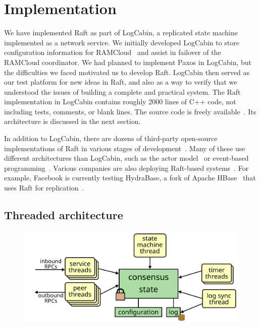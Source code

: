 \section{Implementation}

We have implemented Raft as part of LogCabin, a replicated state machine
implemented
as a network service. We initially developed LogCabin to store
configuration information for RAMCloud~\cite{Ousterhout:2011} and assist
in failover of the RAMCloud coordinator. We had planned to implement
Paxos in LogCabin, but the difficulties we faced motivated us to develop
Raft. LogCabin then served as our test platform for new ideas in Raft,
and also as a way to verify that we understood the issues of building a
complete and practical system. The Raft implementation in LogCabin
contains roughly \num{2000} lines of C++ code, not including tests, comments,
or blank lines. The source code is freely available~\cite{logcabin}.
Its architecture is discussed in the next section.

In addition to LogCabin, there are dozens of third-party open-source
implementations of Raft in various stages of
development~\cite{implementations}. Many of these use different
architectures than LogCabin, such as the actor
model~\cite{impl:rafter,impl:akka-raft,impl:archie-raft} or event-based
programming~\cite{impl:kanaka-raft-js,impl:barge,impl:kontiki}. Various
companies are also deploying Raft-based systems~\cite{implementations}.
For example, Facebook is currently testing HydraBase, a fork of Apache
HBase~\cite{HBase}
that uses Raft for replication~\cite{HydraBase}.

\subsection{Threaded architecture}
\label{performance:threads}

\begin{figure}
\centering
\includegraphics[scale=.4]{performance/threads}
\label{fig:performance:architecture}
\end{figure}

